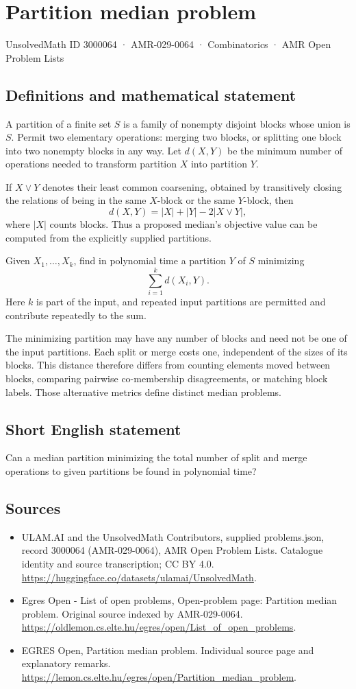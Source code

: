 \documentclass[11pt,a4paper]{article}
\begin{document}
\section*{Partition median problem}\label{3000064}
{\small UnsolvedMath ID 3000064 · AMR-029-0064 · Combinatorics · AMR Open Problem Lists}
\subsection{Definitions and mathematical statement}
A partition of a finite set $S$ is a family of nonempty disjoint
blocks whose union is $S$. Permit two elementary operations:
merging two blocks, or splitting one block into two nonempty blocks
in any way. Let $d(X,Y)$ be the minimum number of operations needed
to transform partition $X$ into partition $Y$.

If $X\vee Y$ denotes their least common coarsening, obtained by
transitively closing the relations of being in the same $X$-block
or the same $Y$-block, then
\[
                     d(X,Y)=|X|+|Y|-2|X\vee Y|,
\]
where $|X|$ counts blocks. Thus a proposed median's objective value
can be computed from the explicitly supplied partitions.

Given $X_1,\ldots,X_k$, find in polynomial time a partition $Y$ of
$S$ minimizing
\[
                               \sum_{i=1}^k d(X_i,Y).
\]
Here $k$ is part of the input, and repeated input partitions are
permitted and contribute repeatedly to the sum.

The minimizing partition may have any number of blocks and need
not be one of the input partitions. Each split or merge costs one,
independent of the sizes of its blocks. This distance therefore
differs from counting elements moved between blocks, comparing
pairwise co-membership disagreements, or matching block labels.
Those alternative metrics define distinct median problems.
\subsection{Short English statement}
Can a median partition minimizing the total number of split
and merge operations to given partitions be found in polynomial time?
\subsection{Sources}
\begin{itemize}
\item[S1] ULAM.AI and the UnsolvedMath Contributors, supplied problems.json, record 3000064 (AMR-029-0064), AMR Open Problem Lists. Catalogue identity and source transcription; CC BY 4.0.
\url{https://huggingface.co/datasets/ulamai/UnsolvedMath}.
\item[S2] Egres Open - List of open problems, Open-problem page: Partition median problem. Original source indexed by AMR-029-0064.
\url{https://oldlemon.cs.elte.hu/egres/open/List_of_open_problems}.
\item[S3] EGRES Open, Partition median problem. Individual source page and explanatory remarks.
\url{https://lemon.cs.elte.hu/egres/open/Partition_median_problem}.
\end{itemize}
\end{document}
